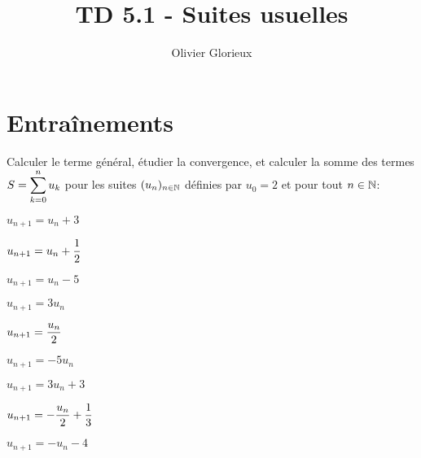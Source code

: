 \documentclass[a4paper, 11pt]{article}
\author{Olivier Glorieux}
\newcommand{\type}{TD }
\begin{document}
\title{\type  5.1 - Suites usuelles}

\section*{Entraînements}

\begin{exercice} \;
Calculer le terme g\'en\'eral, \'etudier la convergence, et calculer la somme des termes $S=\displaystyle \sum\limits_{k=0}^n u_k$ pour les suites $(u_n)_{n\in \mathbb{N}}$ d\'efinies par $u_0=2$ et pour tout $n\in\mathbb{N}$:\\
\begin{enumerate}
\begin{minipage}[t]{0.3\textwidth}
\item 
$u_{n+1}=u_n+3$
\item $u_{n+1}=u_n+\displaystyle\frac{1}{2}$  
\item  
$u_{n+1}=u_n-5$
\end{minipage}
\begin{minipage}[t]{0.3\textwidth}
\item
$u_{n+1}=3u_n$ 
\item
$u_{n+1}=\displaystyle\frac{u_n}{2}$   
\item  
$u_{n+1}=-5u_n$ 
\end{minipage}
\begin{minipage}[t]{0.3\textwidth}
\item
$u_{n+1}=3u_n+3$  
\item
$u_{n+1}=-\displaystyle\frac{u_n}{2}+\displaystyle\frac{1}{3}$   
\item  
$u_{n+1}=-u_n  -4$ 
\end{minipage}
\end{enumerate}
\end{exercice}
\end{document}
